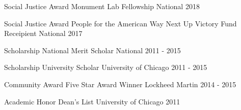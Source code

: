 
\begin{cventries}

  \cventry
    {Social Justice Award}
    {Monument Lab Fellowship}
    {National}
    {2018}
    {}

  \cventry
    {Social Justice Award}
    {People for the American Way Next Up Victory Fund Receipient}
    {National}
    {2017}
    {}

  \cventry
    {Scholarship} %
    {National Merit Scholar} %
    {National} %
    {2011 - 2015} %
    {}

  \cventry
    {Scholarship} %
    {University Scholar} %
    {University of Chicago} %
    {2011 - 2015} %
    {}
    
  \cventry
    {Community Award}
    {Five Star Award Winner}
    {Lockheed Martin}
    {2014 - 2015}
    {}
    

  \cventry
    {Academic Honor} %
    {Dean's List} %
    {University of Chicago} %
    {2011} %
    {}

\end{cventries}
